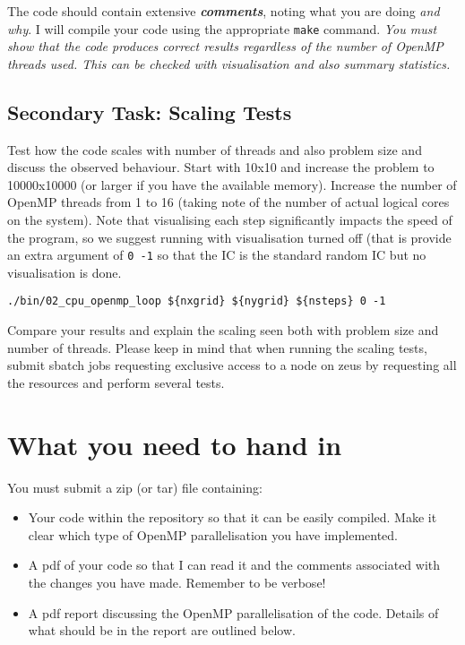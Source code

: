 \documentclass[11pt]{amsart}
\begin{document}
The code should contain extensive \textbf{\textit{comments}}, noting what you are doing \textit{and why}. I will compile your code using the appropriate \texttt{make} command.
{\centering \textit{You must show that the code produces correct results regardless of the number of OpenMP threads used. This can be checked with visualisation and also summary statistics.}}

\subsection{{\color{Red}Secondary Task}: Scaling Tests\nopunct\\}\label{sec:tasks:scaling}
Test how the code scales with number of threads and also problem size and discuss the observed behaviour. Start with 10x10 and increase the problem to 10000x10000 (or larger if you have the available memory). Increase the number of OpenMP threads from 1 to 16 (taking note of the number of actual logical cores on the system). Note that visualising each step significantly impacts the speed of the program, so we suggest running with visualisation turned off (that is provide an extra argument of \texttt{0 -1} so that the IC is the standard random IC but no visualisation is done.
\begin{center}
\begin{minipage}{0.95\textwidth}
\begin{verbatim}
./bin/02_cpu_openmp_loop ${nxgrid} ${nygrid} ${nsteps} 0 -1
\end{verbatim}
\end{minipage}
\end{center}
Compare your results and explain the scaling seen both with problem size and number of threads. Please keep in mind that when running the scaling tests, submit sbatch jobs requesting exclusive access to a node on zeus by requesting all the resources and perform several tests.

\section{{\color{Blue}What you need to hand in\nopunct\\}}\label{sec:handin}

You must submit a zip (or tar) file containing:
\begin{itemize}
\item Your code within the repository so that it can be easily compiled. Make it clear which type of OpenMP parallelisation you have implemented.
\item A pdf of your code so that I can read it and the comments associated with the changes you have made. Remember to be verbose!
\item A pdf report discussing the OpenMP parallelisation of the code. Details of what should be in the report are outlined below.
\end{itemize}
\end{document}

